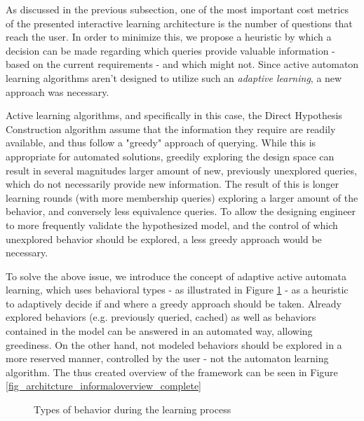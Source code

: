 As discussed in the previous subsection, one of the most important cost metrics of the presented interactive learning architecture is the number of questions that reach the user. In order to minimize this, we propose a heuristic by which a decision can be made regarding which queries provide valuable information - based on the current requirements - and which might not. Since active automaton learning algorithms aren't designed to utilize such an \textit{adaptive learning}, a new approach was necessary. 

Active learning algorithms, and specifically in this case, the Direct Hypothesis Construction algorithm assume that the information they require are readily available, and thus follow a "greedy" approach of querying. While this is appropriate for automated solutions, greedily exploring the design space can result in several magnitudes larger amount of new, previously unexplored queries, which do not necessarily provide new information. The result of this is longer learning rounds (with more membership queries) exploring a larger amount of the behavior, and conversely less equivalence queries. To allow the designing engineer to more frequently validate the hypothesized model, and the control of which unexplored behavior should be explored, a less greedy approach would be necessary.

To solve the above issue, we introduce the concept of adaptive active automata learning, which uses behavioral types - as illustrated in Figure \ref{fig_architcture_commandhandling} - as a heuristic to adaptively decide if and where a greedy approach should be taken. Already explored behaviors (e.g. previously queried, cached) as well as behaviors contained in the model can be answered in an automated way, allowing greediness. On the other hand, not modeled behaviors should be explored in a more reserved manner, controlled by the user - not the automaton learning algorithm. The thus created overview of the framework can be seen in Figure \ref{fig_architcture_informaloverview_complete}

\begin{figure}[!ht] 
	\centering
	\caption{Types of behavior during the learning process} 
	\label{fig_architcture_commandhandling}
\end{figure} 


